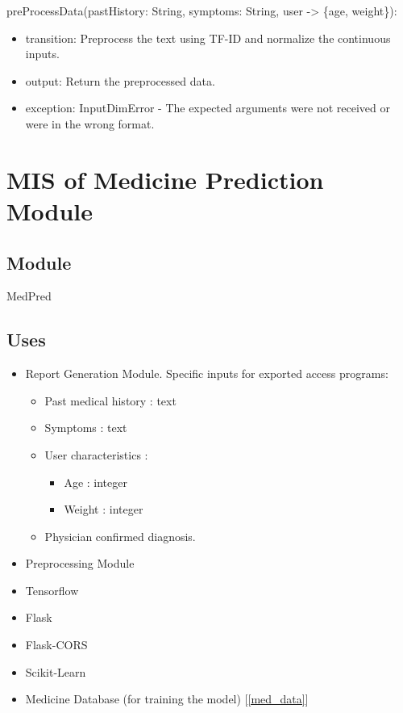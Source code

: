 \documentclass[12pt, titlepage]{article}
\begin{document}
\noindent preProcessData(pastHistory: String, symptoms: String, user -> \{age, weight\}):
\begin{itemize}
\item transition: Preprocess the text using TF-ID and normalize the continuous inputs.
\item output: Return the preprocessed data.
\item exception: InputDimError - The expected arguments were not received or were in the wrong format.
\end{itemize}

\newpage
  
\section{MIS of Medicine Prediction Module} \label{med_pred_mod}


\subsection{Module}

MedPred

\subsection{Uses}
\begin{itemize}
  \item Report Generation Module. Specific inputs for exported access programs:
    \begin{itemize}
      \item Past medical history : text
      \item Symptoms : text
      \item User characteristics :
        \begin{itemize}
          \item Age : integer
          \item Weight : integer
        \end{itemize}
      \item Physician confirmed diagnosis.
    \end{itemize}
  \item Preprocessing Module
  \item Tensorflow
  \item Flask
  \item Flask-CORS
  \item Scikit-Learn
  \item Medicine Database (for training the model) [\ref{med_data}]

\end{itemize}
\end{document}
